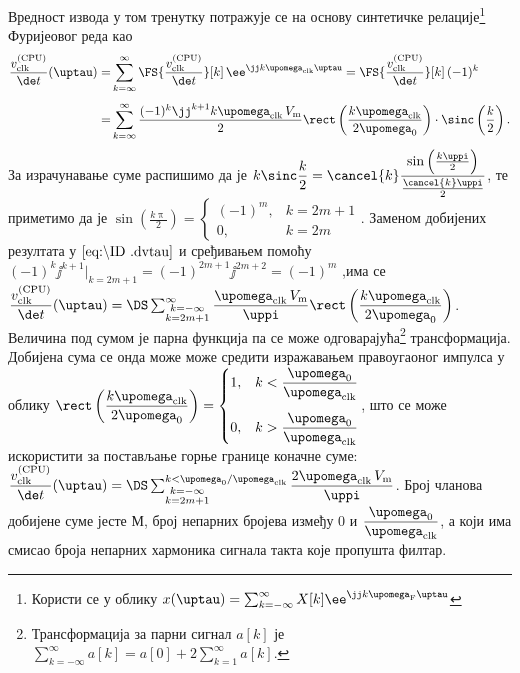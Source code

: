     Вредност извода у том тренутку потражује се на основу синтетичке релације\footnote{
    Користи се у облику $x(\uptau) = \sum_{k = -\infty}^{\infty} X[k] \ee^{\jj k\upomega_{\rm F} \uptau}$
    } Фуријеовог реда као 
    \begin{align}
        \dfrac{v_{\rm clk}^{\rm (CPU)}}{\de t}  (\uptau)
        =& 
        \sum_{k = \infty}^{\infty} 
        \FS{ \dfrac{v_{\rm clk}^{\rm (CPU)}}{\de t} }[k] \, \ee^{\jj k \upomega_{\rm clk} \uptau} 
        = 
        \FS{ \dfrac{v_{\rm clk}^{\rm (CPU)}}{\de t} }[k] \, (-1)^k \\[1.5mm]
        =&
        \sum_{k = \infty}^{\infty} 
        \dfrac{ 
        (-1)^k \jj^{k+1} k \upomega_{\rm clk} \, 
        V_{\rm m} }{2}
        \rect \left( \dfrac{k{\upomega_{\rm clk}}}{2\upomega_0} \right) 
        \cdot
        \sinc \left(
        \dfrac{k}{2} \right). \label{eq:\ID.dvtau}
    \end{align}
    За израчунавање суме распишимо да је 
    $k \sinc\dfrac{k}{2} = 
    \cancel{k} \dfrac{\sin\left( \frac{k\uppi}{2} \right) }{ \frac{\cancel{k}\uppi}{2} }
    $, те приметимо да је \linebreak
    ${\sin\left( \frac{k\uppi}{2} \right) = 
    \begin{cases}
        (-1)^m ,&  k = 2m+1 \\
        0      ,& k = 2m
    \end{cases}}$. Заменом добијених резултата  
    у $\eqref{eq:\ID.dvtau}$ и сређивањем помоћу 
    $ (-1)^k \jj^{k+1} \bigg|_{k = 2m+1} = 
    (-1)^{2m + 1} \jj^{2m + 2} = (-1)^m
    $
    ,има се 
    $
        \dfrac{v_{\rm clk}^{\rm (CPU)}}{\de t}  (\uptau)
        = \DS
        \sum_{\substack{ k = -\infty \\ k = 2m + 1 } }^{\infty} 
        \dfrac{ 
        \upomega_{\rm clk} \, 
        V_{\rm m} }{\uppi}
        \rect \left( \dfrac{{k \upomega_{\rm clk}}}{2\upomega_0} \right)  
    $. Величина под сумом је парна функција па се може одговарајућа\footnote{
        Трансформација за парни сигнал $a[k]$ је 
        $\sum_{k = -\infty}^{\infty} a[k] = a[0] + 2\sum_{k = 1}^{\infty} a[k]$.
    }
    трансформација. Добијена сума се онда може
    може средити изражавањем правоугаоног импулса у облику
    $
        \rect \left( \dfrac{{k \upomega_{\rm clk}}}{2\upomega_0} \right)
        =
        \begin{cases}
            1,& k < \dfrac{\upomega_{\rm 0}}{\upomega_{\rm clk}} \\[5mm]
            0,& k > \dfrac{\upomega_{\rm 0}}{\upomega_{\rm clk}} 
        \end{cases}
    $, што се може искористити за постављање горње границе коначне суме:
    $
        \dfrac{v_{\rm clk}^{\rm (CPU)}}{\de t}  (\uptau)
        = \DS
        \sum_{\substack{ k = -\infty \\ k = 2m + 1 } }^{k < \upomega_0 / \upomega_{\rm clk} } 
        \dfrac{ 2
        \upomega_{\rm clk} \, 
        V_{\rm m} }{\uppi} 
    $. Број чланова добијене суме јесте $М$, број непарних бројева између $0$ и 
    $\dfrac{\upomega_0}{\upomega_{\rm clk}}$, а који има смисао   
    броја непарних хармоника сигнала такта које пропушта филтар.  
    \\[2mm]
    
